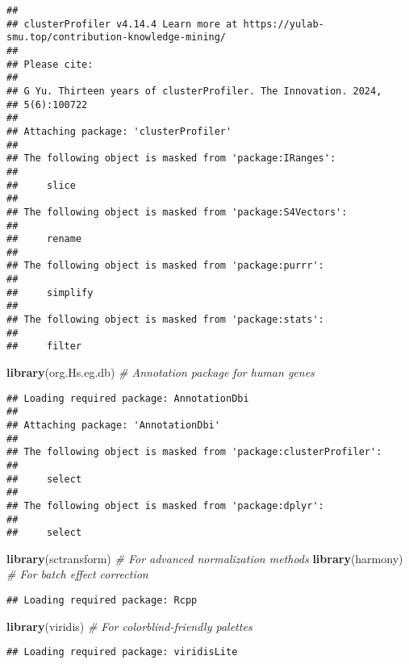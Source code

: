 \documentclass[
]{article}
\newenvironment{Shaded}{\begin{snugshade}}{\end{snugshade}}
\newcommand{\CommentTok}[1]{\textcolor[rgb]{0.56,0.35,0.01}{\textit{#1}}}
\newcommand{\FunctionTok}[1]{\textcolor[rgb]{0.13,0.29,0.53}{\textbf{#1}}}
\newcommand{\NormalTok}[1]{#1}
\begin{document}
\begin{verbatim}
## 
## clusterProfiler v4.14.4 Learn more at https://yulab-smu.top/contribution-knowledge-mining/
## 
## Please cite:
## 
## G Yu. Thirteen years of clusterProfiler. The Innovation. 2024,
## 5(6):100722
## 
## Attaching package: 'clusterProfiler'
## 
## The following object is masked from 'package:IRanges':
## 
##     slice
## 
## The following object is masked from 'package:S4Vectors':
## 
##     rename
## 
## The following object is masked from 'package:purrr':
## 
##     simplify
## 
## The following object is masked from 'package:stats':
## 
##     filter
\end{verbatim}

\begin{Shaded}
\begin{Highlighting}[]
\FunctionTok{library}\NormalTok{(org.Hs.eg.db)   }\CommentTok{\# Annotation package for human genes}
\end{Highlighting}
\end{Shaded}

\begin{verbatim}
## Loading required package: AnnotationDbi
## 
## Attaching package: 'AnnotationDbi'
## 
## The following object is masked from 'package:clusterProfiler':
## 
##     select
## 
## The following object is masked from 'package:dplyr':
## 
##     select
\end{verbatim}

\begin{Shaded}
\begin{Highlighting}[]
\FunctionTok{library}\NormalTok{(sctransform)    }\CommentTok{\# For advanced normalization methods}
\FunctionTok{library}\NormalTok{(harmony)        }\CommentTok{\# For batch effect correction}
\end{Highlighting}
\end{Shaded}

\begin{verbatim}
## Loading required package: Rcpp
\end{verbatim}

\begin{Shaded}
\begin{Highlighting}[]
\FunctionTok{library}\NormalTok{(viridis)        }\CommentTok{\# For colorblind{-}friendly palettes}
\end{Highlighting}
\end{Shaded}

\begin{verbatim}
## Loading required package: viridisLite
\end{verbatim}
\end{document}
